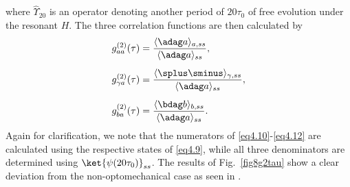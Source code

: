 \noindent where $\hat{\Upsilon}_{20}$ is an operator denoting another period of $20\tau_0$ of free evolution under the resonant $H$. The three correlation functions are then calculated by
%
\begin{align} g^{(2)}_{aa}(\tau) &= \frac{\langle \adag a \rangle_{a,ss}}{\langle \adag a \rangle_{ss}}, \label{eq4.10} \\[5pt]
g^{(2)}_{\gamma a}(\tau) &= \frac{\langle \splus\sminus \rangle_{\gamma,ss}}{\langle \adag a \rangle_{ss}}, \label{eq4.11} \\[5pt]
g^{(2)}_{ba}(\tau) &= \frac{\langle \bdag b \rangle_{b,ss}}{\langle \adag a \rangle_{ss}}. \label{eq4.12} \end{align}
%
Again for clarification, we note that the numerators of \eqref{eq4.10}-\eqref{eq4.12} are calculated using the respective states of \eqref{eq4.9}, while all three denominators are determined using $\ket{\psi(20\tau_0)}_{ss}$. The results of Fig.~\ref{fig8g2tau} show a clear deviation from the non-optomechanical case as seen in \cite{brecha1999}.